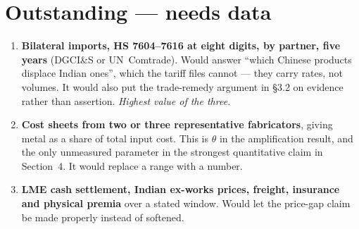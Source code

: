 \documentclass[11pt, a4paper]{article}
\begin{document}
\section{Outstanding --- needs data}

\begin{enumerate}[leftmargin=1.5em, itemsep=4pt]
\item \textbf{Bilateral imports, HS 7604--7616 at eight digits, by partner, five
years} (DGCI\&S or UN~Comtrade). Would answer ``which Chinese products displace
Indian ones'', which the tariff files cannot --- they carry rates, not volumes. It
would also put the trade-remedy argument in §3.2 on evidence rather than assertion.
\emph{Highest value of the three.}

\item \textbf{Cost sheets from two or three representative fabricators}, giving metal
as a share of total input cost. This is $\theta$ in the amplification result, and the
only unmeasured parameter in the strongest quantitative claim in Section~4. It would
replace a range with a number.

\item \textbf{LME cash settlement, Indian ex-works prices, freight, insurance and
physical premia} over a stated window. Would let the price-gap claim be made properly
instead of softened.
\end{enumerate}
\end{document}
